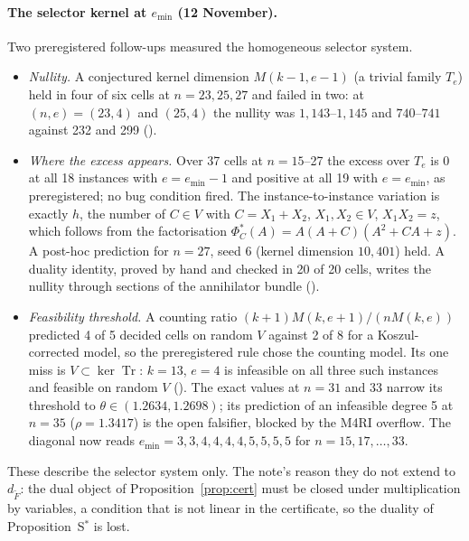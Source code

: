 \paragraph{The selector kernel at $e_{\min}$ (12 November).} Two
preregistered follow-ups measured the homogeneous selector system.
\begin{itemize}
\item \emph{Nullity.} A conjectured kernel dimension $M(k-1,e-1)$ (a
  trivial family $T_e$) held in four of six cells at $n=23,25,27$ and failed
  in two: at $(n,e)=(23,4)$ and $(25,4)$ the nullity was $1{,}143$--$1{,}145$
  and $740$--$741$ against 232 and 299
  ().
\item \emph{Where the excess appears.} Over 37 cells at $n=15$--27 the
  excess over $T_e$ is 0 at all 18 instances with $e=e_{\min}-1$ and
  positive at all 19 with $e=e_{\min}$, as preregistered; no bug condition
  fired. The instance-to-instance variation is exactly $h$, the number of
  $C\in V$ with $C=X_1+X_2$, $X_1,X_2\in V$, $X_1X_2=z$, which follows from
  the factorisation $\Phi^*_C(A)=A(A+C)(A^2+CA+z)$. A post-hoc prediction
  for $n=27$, seed 6 (kernel dimension $10{,}401$) held. A duality
  identity, proved by hand and checked in 20 of 20 cells, writes the nullity
  through sections of the annihilator bundle
  ().
\item \emph{Feasibility threshold.} A counting ratio
  $(k+1)M(k,e+1)/(nM(k,e))$ predicted 4 of 5 decided cells on random $V$
  against 2 of 8 for a Koszul-corrected model, so the preregistered rule
  chose the counting model. Its one miss is $V\subset\ker\operatorname{Tr}$:
  $k=13$, $e=4$ is infeasible on all three such instances and feasible on
  random $V$ ().
  The exact values at $n=31$ and 33 narrow its threshold to
  $\theta\in(1.2634,1.2698)$; its prediction of an infeasible degree 5 at
  $n=35$ ($\rho=1.3417$) is the open falsifier, blocked by the M4RI
  overflow. The diagonal now reads $e_{\min}=3,3,4,4,4,4,5,5,5,5$ for
  $n=15,17,\ldots,33$.
\end{itemize}
These describe the selector system only. The note's reason they do not
extend to $d_{\tilde F}$: the dual object of Proposition~\ref{prop:cert} must
be closed under multiplication by variables, a condition that is not linear
in the certificate, so the duality of Proposition~S$^*$ is lost.

